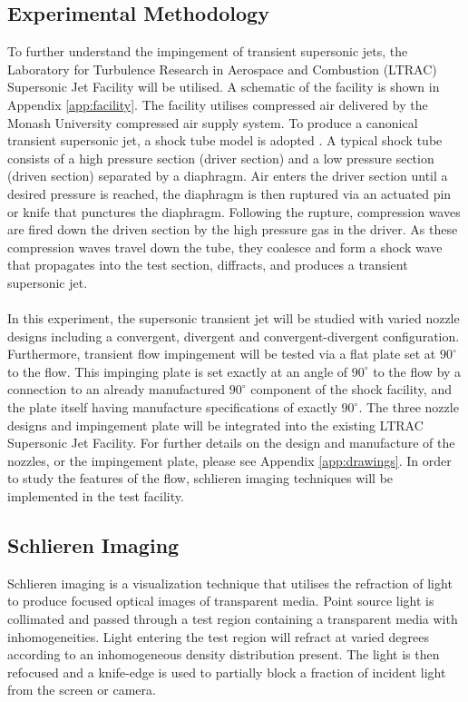 \subsection{Experimental Methodology}
To further understand the impingement of transient supersonic jets, the Laboratory for Turbulence Research in Aerospace and Combustion (LTRAC) Supersonic Jet Facility will be utilised. A schematic of the facility is shown in Appendix \ref{app:facility}. The facility utilises compressed air delivered by the Monash University compressed air supply system. To produce a canonical transient supersonic jet, a shock tube model is adopted \cite{bradley1962}. A typical shock tube consists of a high pressure section (driver section) and a low pressure section (driven section) separated by a diaphragm. Air enters the driver section until a desired pressure is reached, the diaphragm is then ruptured via an actuated pin or knife that punctures the diaphragm. Following the rupture, compression waves are fired down the driven section by the high pressure gas in the driver. As these compression waves travel down the tube, they coalesce and form a shock wave that propagates into the test section, diffracts, and produces a transient supersonic jet. 
\\\\
In this experiment, the supersonic transient jet will be studied with varied nozzle designs including a convergent, divergent and convergent-divergent configuration. Furthermore, transient flow impingement will be tested via a flat plate set at $90^{\circ}$ to the flow. This impinging plate is set exactly at an angle of $90^{\circ}$ to the flow by a connection to an already manufactured $90^{\circ}$ component of the shock facility, and the plate itself having manufacture specifications of exactly $90^{\circ}$. The three nozzle designs and impingement plate will be integrated into the existing LTRAC Supersonic Jet Facility. For further details on the design and manufacture of the nozzles, or the impingement plate, please see Appendix \ref{app:drawings}. In order to study the features of the flow, schlieren imaging techniques will be implemented in the test facility.

\subsection{Schlieren Imaging}
Schlieren imaging is a visualization technique that utilises the refraction of light to produce focused optical images of transparent media. Point source light is collimated and passed through a test region containing a transparent media with inhomogeneities.  Light entering the test region will refract at varied degrees according to an inhomogeneous density distribution present. The light is then refocused and a knife-edge is used to partially block a fraction of incident light from the screen or camera. 

